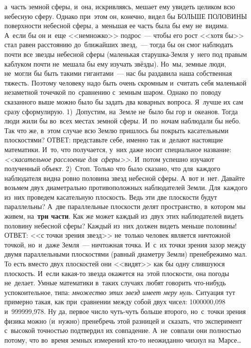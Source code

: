{а~часть земной сферы, и~она, искривляясь, мешает ему увидеть целиком всю небесную сферу. Однако
при~этом он, конечно, видел бы БОЛЬШЕ ПОЛОВИНЫ поверхности небесной сферы, а~меньшая ее часть была
бы ему не~видима. А~если бы он и~еще <<немножко>> подрос~--- чтобы его рост <<хотя бы>> стал равен
расстоянию до~ближайших звезд,~--- тогда бы он смог наблюдать почти все звезды небесной сферы
(маленькая старушка-Земля у~него под правым каблуком почти не~мешала бы ему изучать звёзды). Но~мы,
земные люди, не~могли бы быть такими гигантами~--- нас бы раздавила наша собственная тяжесть.
Поэтому человеку надо быть очень скромным и~считать себя маленькой незаметной точечкой по~сравнению
с~земным шаром. Однако по~поводу сказанного выше можно было бы задать два коварных вопроса. Я~лучше
их сам сразу сформулирую. 1)~Допустим, на~Земле не~было бы гор и~океанов. Тогда люди жили бы
во~всех местах земной сферы. И~по~ночам наблюдали бы небо. Так что же, в~этом случае всю Землю
пришлось бы покрыть касательными плоскостями? ОТВЕТ: представьте себе, именно так и~делают
настоящие математики. И~то, что получается, у~них даже носит специальное название: \textit{<<касательное
расслоение для~сферы>>}. И~потом успешно изучают полученный объект. 2)~Стоп. Только что было
сказано, что для~каждого наблюдателя видна ровно половина звезд небесной сферы. А~вот и~нет.
Давайте возьмем двух диаметрально противоположных наблюдателей Земли. Для~каждого из~них проведем
касательную плоскость. Ведь эти две плоскости будут параллельны? А~две параллельные плоскости делят
пространство, в~котором мы живем, на~\textbf{три части}. Как же может каждый из~двух этих наблюдателей
видеть половину небесной сферы? Каждый из~них должен видеть меньше половины! ОТВЕТ: <<с точки
зрения звезд>> не~только человек является ничтожной точкой, но~и~даже Земля~--- ничтожная точка.
И~с~их точки зрения зазор между двумя параллельными плоскостями (равный диаметру Земли)
пренебрежимо мал. То есть вместо двух плоскостей они <<видят>> как бы одну слившуюся плоскость.
И~если какая-то звезда окажется на~этой плоскости, она погоды не~делает. Умные математики в~таких
случаях любят говорить что-нибудь успокоительное, типа: \textit{множество этих звезд имеет меру нуль}.
Ситуация тут примерно такая, как при~сравнении между собой двух чисел: 1000000,098 и~999999,978. Ну
да, первое число чуть-чуть больше второго, но~с~точки зрения физика можно (и~нужно) пренебречь этой
разницей и~сказать, что эксперимент с~высокой точностью подтвердил их совпадение. А~не~совпали они
полностью потому, что во~время земных измерений кто-то неожиданно чихнул на~Марсе\ldots

}


